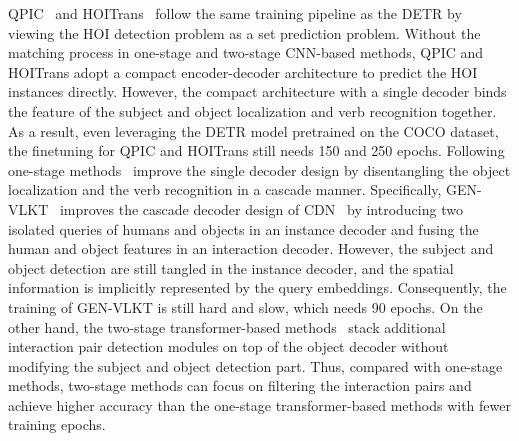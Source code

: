 \documentclass[10pt,twocolumn,letterpaper]{article}
\begin{document}
QPIC~\cite{tamura2021qpic} and HOITrans~\cite{zou2021end} follow the same training pipeline as the DETR by viewing the HOI detection problem as a set prediction problem.
Without the matching process in one-stage and two-stage CNN-based methods, QPIC and HOITrans adopt a compact encoder-decoder architecture to predict the HOI instances directly.
However, the compact architecture with a single decoder binds the feature of the subject and object localization and verb recognition together.
As a result, even leveraging the DETR model pretrained on the COCO dataset, the finetuning for QPIC and HOITrans still needs 150 and 250 epochs.
Following one-stage methods~\cite{zhang2021mining,liao2022gen,yuan2022detecting,iftekhar2022look,zhou2022human,yuan2022rlip} improve the single decoder design by disentangling the object localization and the verb recognition in a cascade manner.
Specifically, GEN-VLKT~\cite{liao2022gen} improves the cascade decoder design of CDN~\cite{zhang2021mining} by introducing two isolated queries of humans and objects in an instance decoder and fusing the human and object features in an interaction decoder.
However, the subject and object detection are still tangled in the instance decoder, and the spatial information is implicitly represented by the query embeddings.
Consequently, the training of GEN-VLKT is still hard and slow, which needs 90 epochs.
On the other hand, the two-stage transformer-based methods~\cite{Zhang_2022_CVPR,Liu_2022_CVPR,zhang2022exploring} stack additional interaction pair detection modules on top of the object decoder without modifying the subject and object detection part.
Thus, compared with one-stage methods, two-stage methods can focus on filtering the interaction pairs and achieve higher accuracy than the one-stage transformer-based methods with fewer training epochs.
\end{document}
